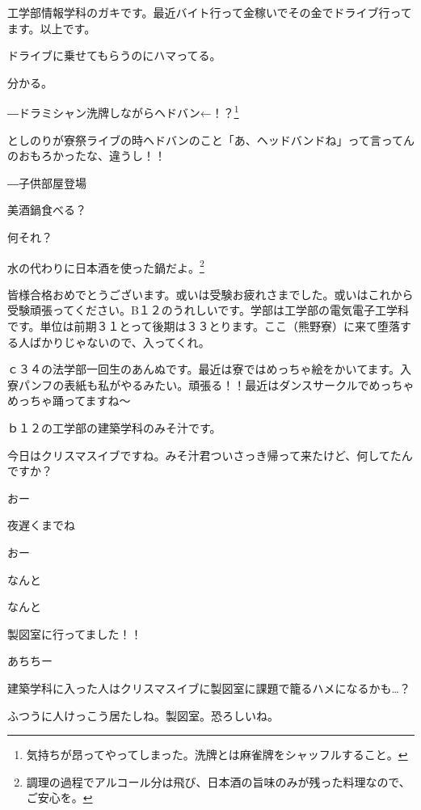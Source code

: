 \begin{multicols}{2}
工学部情報学科のガキです。最近バイト行って金稼いでその金でドライブ行ってます。以上です。

ドライブに乗せてもらうのにハマってる。

分かる。

\par\hspace{5mm} ―ドラミシャン洗牌しながらヘドバン←！？\footnote{気持ちが昂ってやってしまった。洗牌とは麻雀牌をシャッフルすること。}

としのりが寮祭ライブの時ヘドバンのこと「あ、ヘッドバンドね」って言ってんのおもろかったな、違うし！！

\par\hspace{5mm}―子供部屋登場

美酒鍋食べる？

何それ？

水の代わりに日本酒を使った鍋だよ。\footnote{調理の過程でアルコール分は飛び、日本酒の旨味のみが残った料理なので、ご安心を。}

皆様合格おめでとうございます。或いは受験お疲れさまでした。或いはこれから受験頑張ってください。B１２のうれしいです。学部は工学部の電気電子工学科です。単位は前期３１とって後期は３３とります。ここ（熊野寮）に来て堕落する人ばかりじゃないので、入ってくれ。

ｃ３４の法学部一回生のあんぬです。最近は寮ではめっちゃ絵をかいてます。入寮パンフの表紙も私がやるみたい。頑張る！！最近はダンスサークルでめっちゃめっちゃ踊ってますね〜

ｂ１２の工学部の建築学科のみそ汁です。

今日はクリスマスイブですね。みそ汁君ついさっき帰って来たけど、何してたんですか？

おー

夜遅くまでね

おー

なんと

なんと

製図室に行ってました！！

あちちー

建築学科に入った人はクリスマスイブに製図室に課題で籠るハメになるかも…？

ふつうに人けっこう居たしね。製図室。恐ろしいね。


\end{multicols}

